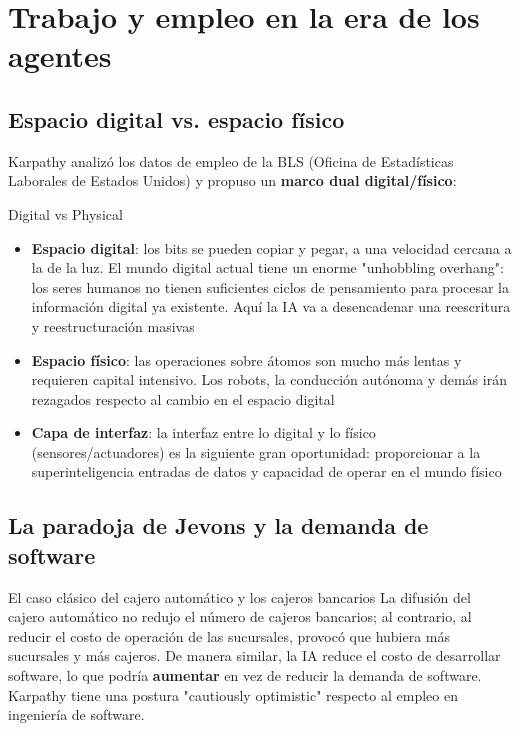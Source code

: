 \section{Trabajo y empleo en la era de los agentes}

\subsection{Espacio digital vs. espacio físico}

Karpathy analizó los datos de empleo de la BLS (Oficina de Estadísticas Laborales de Estados Unidos) y propuso un \textbf{marco dual digital/físico}:

\begin{importantbox}{Digital vs Physical}
\begin{itemize}
    \item \textbf{Espacio digital}: los bits se pueden copiar y pegar, a una velocidad cercana a la de la luz. El mundo digital actual tiene un enorme "unhobbling overhang": los seres humanos no tienen suficientes ciclos de pensamiento para procesar la información digital ya existente. Aquí la IA va a desencadenar una reescritura y reestructuración masivas
    \item \textbf{Espacio físico}: las operaciones sobre átomos son mucho más lentas y requieren capital intensivo. Los robots, la conducción autónoma y demás irán rezagados respecto al cambio en el espacio digital
    \item \textbf{Capa de interfaz}: la interfaz entre lo digital y lo físico (sensores/actuadores) es la siguiente gran oportunidad: proporcionar a la superinteligencia entradas de datos y capacidad de operar en el mundo físico
\end{itemize}
\end{importantbox}

\subsection{La paradoja de Jevons y la demanda de software}

\begin{knowledgebox}{El caso clásico del cajero automático y los cajeros bancarios}
La difusión del cajero automático no redujo el número de cajeros bancarios; al contrario, al reducir el costo de operación de las sucursales, provocó que hubiera más sucursales y más cajeros. De manera similar, la IA reduce el costo de desarrollar software, lo que podría \textbf{aumentar} en vez de reducir la demanda de software. Karpathy tiene una postura "cautiously optimistic" respecto al empleo en ingeniería de software.
\end{knowledgebox}

